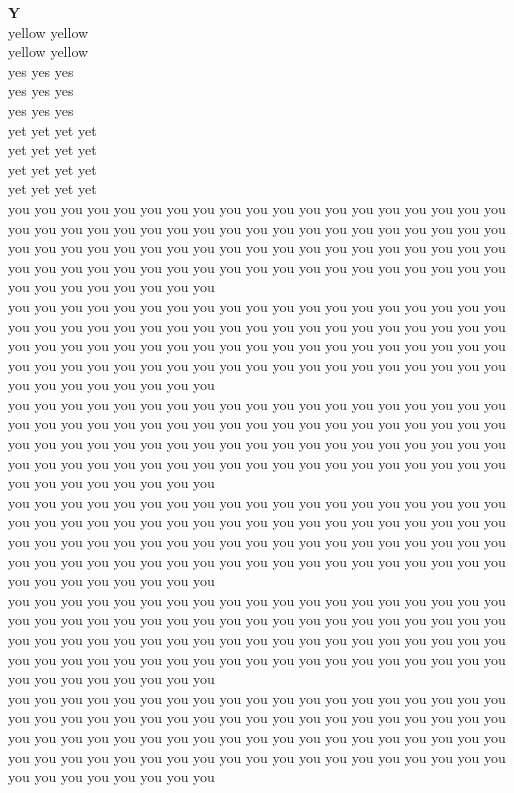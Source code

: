 \vspace{14pt}
\noindent\textbf{\Large Y}\\[+12pt]
yellow yellow\\
yellow yellow\\
yes yes yes\\
yes yes yes\\
yes yes yes\\
yet yet yet yet\\
yet yet yet yet\\
yet yet yet yet\\
yet yet yet yet\\
you you you you you you you you you you you you you you you you you you you you you you you you you you you you you you you you you you you you you you you you you you you you you you you you you you you you you you you you you you you you you you you you you you you you you you you you you you you you you you you you you you you you\\
you you you you you you you you you you you you you you you you you you you you you you you you you you you you you you you you you you you you you you you you you you you you you you you you you you you you you you you you you you you you you you you you you you you you you you you you you you you you you you you you you you you you\\
you you you you you you you you you you you you you you you you you you you you you you you you you you you you you you you you you you you you you you you you you you you you you you you you you you you you you you you you you you you you you you you you you you you you you you you you you you you you you you you you you you you you\\
you you you you you you you you you you you you you you you you you you you you you you you you you you you you you you you you you you you you you you you you you you you you you you you you you you you you you you you you you you you you you you you you you you you you you you you you you you you you you you you you you you you you\\
you you you you you you you you you you you you you you you you you you you you you you you you you you you you you you you you you you you you you you you you you you you you you you you you you you you you you you you you you you you you you you you you you you you you you you you you you you you you you you you you you you you you\\
you you you you you you you you you you you you you you you you you you you you you you you you you you you you you you you you you you you you you you you you you you you you you you you you you you you you you you you you you you you you you you you you you you you you you you you you you you you you you you you you you you you you\\
